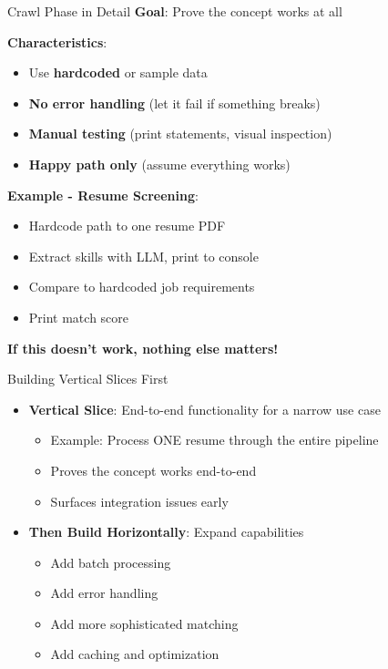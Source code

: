 \documentclass[aspectratio=169]{beamer}
\begin{document}
\begin{frame}{Crawl Phase in Detail}
\textbf{Goal}: Prove the concept works at all
\vspace{0.3cm}

\textbf{Characteristics}:
\begin{itemize}
    \item Use \textbf{hardcoded} or sample data
    \item \textbf{No error handling} (let it fail if something breaks)
    \item \textbf{Manual testing} (print statements, visual inspection)
    \item \textbf{Happy path only} (assume everything works)
\end{itemize}
\vspace{0.3cm}

\textbf{Example - Resume Screening}:
\begin{itemize}
    \item Hardcode path to one resume PDF
    \item Extract skills with LLM, print to console
    \item Compare to hardcoded job requirements
    \item Print match score
\end{itemize}
\vspace{0.2cm}
\textbf{If this doesn't work, nothing else matters!}
\end{frame}

\begin{frame}{Building Vertical Slices First}
\begin{itemize}
    \item \textbf{Vertical Slice}: End-to-end functionality for a narrow use case
    \begin{itemize}
        \item Example: Process ONE resume through the entire pipeline
        \item Proves the concept works end-to-end
        \item Surfaces integration issues early
    \end{itemize}
    \vspace{0.3cm}
    \item \textbf{Then Build Horizontally}: Expand capabilities
    \begin{itemize}
        \item Add batch processing
        \item Add error handling
        \item Add more sophisticated matching
        \item Add caching and optimization
    \end{itemize}
\end{itemize}
\end{frame}
\end{document}

